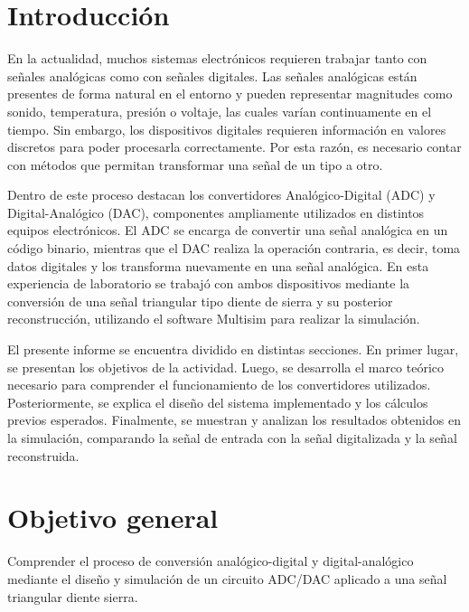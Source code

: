 \documentclass[12pt,letterpaper]{article}
\begin{document}
    \newpage

    \tableofcontents
    
    \newpage

    \section{Introducción}

    En la actualidad, muchos sistemas electrónicos requieren trabajar tanto con señales analógicas como con señales digitales. Las señales analógicas están presentes de forma natural en el entorno y pueden representar magnitudes como sonido, temperatura, presión o voltaje, las cuales varían continuamente en el tiempo. Sin embargo, los dispositivos digitales requieren información en valores discretos para poder procesarla correctamente. Por esta razón, es necesario contar con métodos que permitan transformar una señal de un tipo a otro.

    Dentro de este proceso destacan los convertidores Analógico-Digital (ADC) y Digital-Analógico (DAC), componentes ampliamente utilizados en distintos equipos electrónicos. El ADC se encarga de convertir una señal analógica en un código binario, mientras que el DAC realiza la operación contraria, es decir, toma datos digitales y los transforma nuevamente en una señal analógica. En esta experiencia de laboratorio se trabajó con ambos dispositivos mediante la conversión de una señal triangular tipo diente de sierra y su posterior reconstrucción, utilizando el software Multisim para realizar la simulación.

    El presente informe se encuentra dividido en distintas secciones. En primer lugar, se presentan los objetivos de la actividad. Luego, se desarrolla el marco teórico necesario para comprender el funcionamiento de los convertidores utilizados. Posteriormente, se explica el diseño del sistema implementado y los cálculos previos esperados. Finalmente, se muestran y analizan los resultados obtenidos en la simulación, comparando la señal de entrada con la señal digitalizada y la señal reconstruida.
    
    \section{Objetivo general}
Comprender el proceso de conversión analógico-digital y digital-analógico mediante el diseño y simulación de un circuito ADC/DAC aplicado a una señal triangular diente sierra. 
\end{document}
